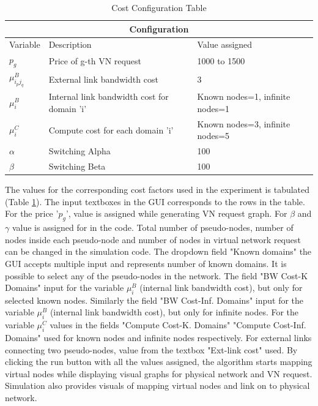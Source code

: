 \documentclass[article,dr=phil,type=msc ,colorback,accentcolor=tud4b]{tudthesis}
\begin{document}
\begin{table}[h]
	\centering
	\caption{Cost Configuration Table}
	\label{cost_table}
	\begin{tabular}{ |p{2cm}||p{5cm}|p{3cm}|} 
		\hline
		\multicolumn{3}{|c|}{Configuration} \\[2ex]
		\hline
		Variable& Description &Value assigned\\[2ex]
		\hline
		$p_{g}$   & Price of g-th VN request & 1000 to 1500 \\[3ex]
		$\mu_{i_{p}j_{q}}^{B}$ &   External link bandwidth cost  & 3   \\[3ex]
		$\mu_{i}^{B}$ & Internal link bandwidth cost for domain 'i' & Known nodes=1, infinite nodes=1\\[3ex]
		$\mu^{C}_{i}$    & Compute cost for each domain 'i' &  Known nodes=3, infinite nodes=5\\[3ex]
		$\alpha$ &   Switching Alpha  & 100\\[3ex]
		$\beta$ &   Switching Beta  & 100\\[3ex]
		\hline
	\end{tabular}
\end{table}
The values for the corresponding cost factors used in the experiment is tabulated (Table \ref{cost_table}). The input textboxes in the GUI corresponds to the rows in the table. For the price '$p_{g}$', value is assigned while generating VN request graph. For $\beta$ and $\gamma$ value is assigned for in the code. Total number of pseudo-nodes, number of nodes inside each pseudo-node and number of nodes in virtual network request can be changed in the simulation code. The dropdown field "Known domains"  the GUI accepts multiple input and represents number of known domains. It is possible to select any of the pseudo-nodes in the network. The field "BW Cost-K Domains"  input for the variable $\mu_{i}^{B}$ (internal link bandwidth cost), but only for selected known nodes. Similarly the field "BW Cost-Inf. Domains"  input for the variable $\mu_{i}^{B}$ (internal link bandwidth cost), but only for infinite nodes. For the variable $\mu_{i}^{C}$ values in the fields "Compute Cost-K. Domains"   "Compute Cost-Inf. Domains"  used for known nodes and infinite nodes respectively. For external links connecting two pseudo-nodes, value from the textbox "Ext-link cost"  used. By clicking the run button with all the values assigned, the algorithm starts mapping virtual nodes while displaying visual graphs for physical network and VN request. Simulation also provides visuals of mapping virtual nodes and link on to physical network.\newline
\end{document}
